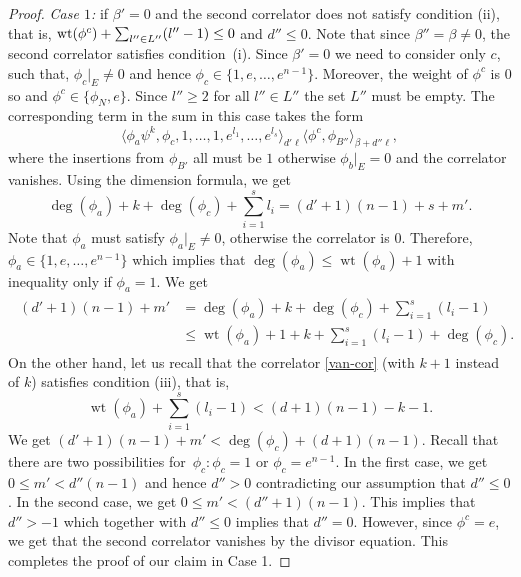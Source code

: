 \documentclass[pdftex]{sigma}
\numberwithin{equation}{section}
\begin{document}
\begin{proof}
{\em Case $1$:} if $\beta'=0$ and the second correlator does not satisfy condition (ii), that is,
${\rm wt}(\phi^c)+\sum_{l''\in L''} (l''-1) \leq 0$ and $d''\leq 0$. Note that since $\beta''=\beta\neq 0$, the second correlator satisfies condition~(i). Since $\beta'=0$ we need to consider only $c$, such that,
$\phi_c|_{E}\neq 0$ and hence ${\phi_c\in \big\{ 1, e, \dots, e^{n-1}\big\}}$. Moreover, the weight of $\phi^c$ is $0$
so  and $\phi^c\in \{\phi_N, e\}$. Since $l''\geq 2$ for all $l''\in L''$ the set
$L''$ must be empty. The corresponding term in the sum in this case takes the form
\[
\big\langle \phi_a\psi^k, \phi_c,1,\dots,1, e^{l_1},\dots, e^{l_s}\big\rangle_{d'\ell}
\langle \phi^c, \phi_{B''}\rangle_{\beta +d''\ell},
\]
where the insertions from $\phi_{B'}$ all must be $1$ otherwise ${\phi_b}|_E=0$ and the correlator vanishes.
Using the dimension formula, we get
\[
\operatorname{deg}(\phi_a) + k + \operatorname{deg}(\phi_c) +\sum_{i=1}^s l_i =
(d'+1)(n-1) + s + m'.
\]
Note that $\phi_a$ must satisfy $\phi_a|_E\neq 0$, otherwise the correlator is 0. Therefore,
$\phi_a\in \big\{ 1,e,\dots,e^{n-1} \big\}$ which implies that $\operatorname{deg}(\phi_a)\leq \operatorname{wt}(\phi_a)+1$ with inequality only if $\phi_a=1$. We get
\begin{align*}
\begin{aligned}
(d'+1)(n-1) + m' &=
\operatorname{deg}(\phi_a) + k + \operatorname{deg}(\phi_c) +\sum_{i=1}^s (l_i-1)\\
&\leq
\operatorname{wt}(\phi_a)+1+k + \sum_{i=1}^s (l_i-1) + \operatorname{deg}(\phi_c).
\end{aligned}
\end{align*}
On the other hand, let us recall that the correlator \eqref{van-cor} (with $k+1$ instead of $k$) satisfies condition (iii), that is,
\[
\operatorname{wt}(\phi_a)+\sum_{i=1}^s (l_i-1)<(d+1)(n-1)-k-1.
\]
We get $(d'+1)(n-1) + m' < \operatorname{deg}(\phi_c) + (d+1)(n-1)$. Recall that there are two possibilities for~$\phi_c\colon \phi_c=1$ or $\phi_c=e^{n-1}$. In the first case, we get $0\leq m'<d''(n-1)$ and hence $d''>0$ contradicting our assumption that $d''\leq 0$. In the second case, we get $0\leq m'<(d''+1)(n-1)$. This implies that $d''>-1$ which together with $d''\leq 0$ implies that $d''=0$. However, since $\phi^c= e$, we get that the second correlator vanishes by the divisor equation. This completes the proof of our claim in Case 1.


\end{proof}
\end{document}

